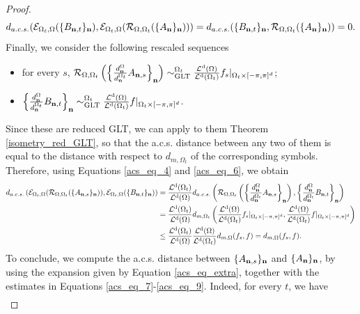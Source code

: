 \documentclass[10pt,a4paper]{amsart}
\DeclareMathOperator{\Ld}{\mathcal{L}^d}
\begin{document}
\begin{proof}
   \begin{equation}\label{acs_eq_8}
       d_{a.c.s.}(\mathcal{E}_{\Omega_t,\Omega}(\{B_{\bfn,t}\}_\bfn),\mathcal{E}_{\Omega_t,\Omega}(\mathcal{R}_{\Omega,\Omega_t}(\{A_\bfn\}_\bfn)))=d_{a.c.s.}(\{B_{\bfn,t}\}_\bfn,\mathcal{R}_{\Omega,\Omega_t}(\{A_\bfn\}_\bfn))=0.
   \end{equation}
   Finally, we consider the following rescaled sequences 
   \begin{itemize}
       \item for every $s$, $\mathcal{R}_{\Omega,\Omega_t}\left(\left\{\frac{d_\bfn^{\Omega}}{d_\bfn^{\Omega_t}}A_{\bfn,s}\right\}_\bfn\right)\sim_{\mathrm{GLT}}^{\Omega_t}\frac{\Ld(\Omega)}{\Ld(\Omega_t)}f_s|_{\Omega_t\times[-\pi,\pi]^d}$;
       \item $\left\{\frac{d_\bfn^{\Omega}}{d_\bfn^{\Omega_t}}B_{\bfn,t}\right\}_\bfn\sim_{\mathrm{GLT}}^{\Omega_t}\frac{\Ld(\Omega)}{\Ld(\Omega_t)}f|_{\Omega_t\times[-\pi,\pi]^d}$.
   \end{itemize}
   Since these are reduced GLT, we can apply to them Theorem \ref{isometry_red_GLT}, so that the a.c.s. distance between any two of them is equal to the distance with respect to $d_{m,\Omega_t}$ of the corresponding symbols. 
   Therefore, using Equations \eqref{acs_eq_4} and \eqref{acs_eq_6}, we obtain 
   \begin{align}\label{acs_eq_9}
       \nonumber d_{a.c.s.}\left(\mathcal{E}_{\Omega_t,\Omega}(\mathcal{R}_{\Omega,\Omega_t}(\{A_{\bfn,s}\}_\bfn)),\mathcal{E}_{\Omega_t,\Omega}(\{B_{\bfn,t}\}_\bfn)\right)&=\frac{\Ld(\Omega_t)}{\Ld(\Omega)}d_{a.c.s.}\left(\mathcal{R}_{\Omega,\Omega_t}\left(\left\{\frac{d_\bfn^{\Omega}}{d_\bfn^{\Omega_t}}A_{\bfn,s}\right\}_\bfn\right),\left\{\frac{d_\bfn^{\Omega}}{d_\bfn^{\Omega_t}}B_{\bfn,t}\right\}_\bfn\right)\\
         &=\frac{\Ld(\Omega_t)}{\Ld(\Omega)}d_{m,\Omega_t}\left(\frac{\Ld(\Omega)}{\Ld(\Omega_t)}f_s|_{\Omega_t\times[-\pi,\pi]^d},\frac{\Ld(\Omega)}{\Ld(\Omega_t)}f|_{\Omega_t\times[-\pi,\pi]^d}\right)\\
        \nonumber &\leq \frac{\Ld(\Omega_t)}{\Ld(\Omega)}\frac{\Ld(\Omega)}{\Ld(\Omega_t)}d_{m,\Omega}(f_s,f)=d_{m,\Omega}(f_s,f).
   \end{align}
   To conclude, we compute the a.c.s. distance between $\{A_{\mathbf n,s}\}_\mathbf n$ and $\{A_\mathbf n\}_\mathbf n$, by using the expansion given by Equation \eqref{acs_eq_extra}, together with the estimates in Equations \eqref{acs_eq_7}-\eqref{acs_eq_9}. Indeed, for every $t$, we have 
   \begin{align}\label{acs_eq_10}

\end{align}
\end{proof}
\end{document}
